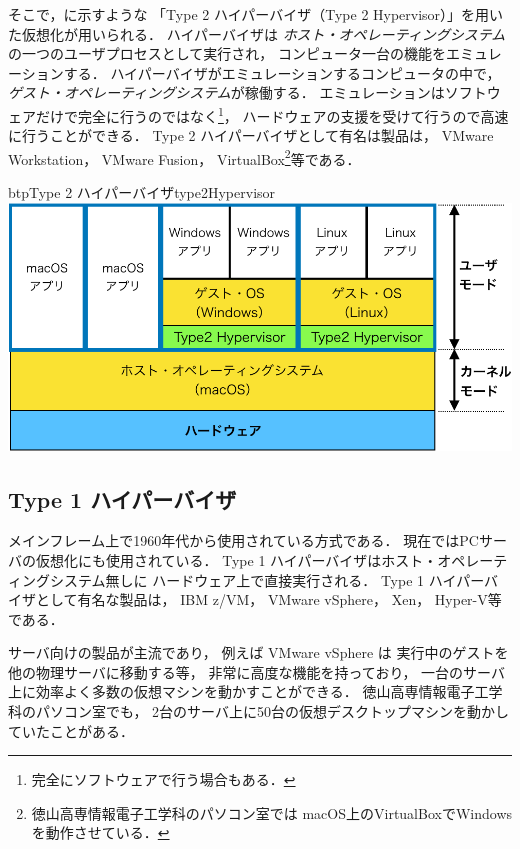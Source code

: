 そこで，に示すような
「Type 2 ハイパーバイザ（Type 2 Hypervisor）」を用いた仮想化が用いられる．
ハイパーバイザは
\emph{ホスト・オペレーティングシステム}の一つのユーザプロセスとして実行され，
コンピュータ一台の機能をエミュレーションする．
ハイパーバイザがエミュレーションするコンピュータの中で，
\emph{ゲスト・オペレーティングシステム}が稼働する．
エミュレーションはソフトウェアだけで完全に行うのではなく\footnote{
  完全にソフトウェアで行う場合もある．}，
ハードウェアの支援を受けて行うので高速に行うことができる\cite{virtualization}．
Type 2 ハイパーバイザとして有名は製品は，
VMware Workstation，
VMware Fusion，
VirtualBox\footnote{
  徳山高専情報電子工学科のパソコン室では
  macOS上のVirtualBoxでWindowsを動作させている．
}等である．

\begin{myfig}{btp}{Type 2 ハイパーバイザ}{type2Hypervisor}
  \includegraphics[scale=0.66]{Fig/type2Hypervisor-crop.pdf}
\end{myfig}

\subsection{Type 1 ハイパーバイザ}
メインフレーム上で1960年代から使用されている方式である．
現在ではPCサーバの仮想化にも使用されている．
Type 1 ハイパーバイザはホスト・オペレーティングシステム無しに
ハードウェア上で直接実行される．
Type 1 ハイパーバイザとして有名な製品は，
IBM z/VM，
VMware vSphere，
Xen，
Hyper-V等である．

サーバ向けの製品が主流であり，
例えば VMware vSphere は
実行中のゲストを他の物理サーバに移動する等，
非常に高度な機能を持っており\cite{vsphere}，
一台のサーバ上に効率よく多数の仮想マシンを動かすことができる．
徳山高専情報電子工学科のパソコン室でも，
2台のサーバ上に50台の仮想デスクトップマシンを動かしていたことがある．

